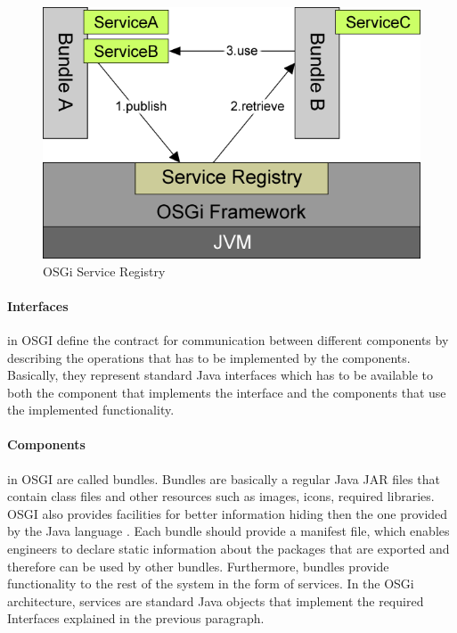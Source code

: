 \begin{figure}[h!]
  \centering
  	\includegraphics[scale=0.6]{plug-in/OSGI.png}
  \caption{OSGi Service Registry \cite{Andre}}
\end{figure}

\paragraph{Interfaces}
 in OSGI define the contract for communication between different components by describing the operations that has to be implemented by the components. Basically, they represent standard Java interfaces which has to be available to both the component that implements the interface and the components that use the implemented functionality.


\paragraph{Components}
  in OSGI are called bundles. Bundles are basically a regular Java JAR files that contain class files and other resources such as images, icons, required libraries. OSGI also provides facilities for better information hiding then the one provided by the Java language \cite{Andre}. Each bundle should provide a manifest file, which enables engineers to declare static information about the packages that are exported and therefore can be used by other bundles. Furthermore, bundles provide functionality to the rest of the system in the form of services. In the OSGi architecture, services are standard Java objects that implement the required  Interfaces explained in the previous paragraph.

